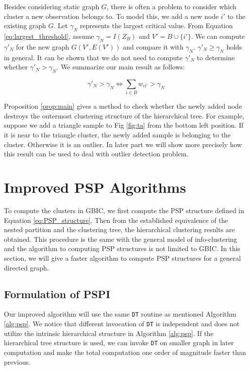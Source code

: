Besides considering static graph $G$, there is often a problem to consider which cluster a new observation belongs to.
To model this, we add a new node $i'$ to the existing graph $G$. Let $\gamma_N$ represents the largest critical value.
From Equation \eqref{eq:largest_threshold}, assume $\gamma_N = I(Z_B)$ and $V'=B \cup \{i'\}$. We can compute $\gamma'_N$ for the new graph $G(V', E(V'))$ and compare it with $\gamma_N$. $\gamma'_N \geq \gamma_N$ holds in general. It can be shown that we do not need to compute $\gamma'_N$ to determine whether $\gamma'_N>\gamma_N$. We summarize our main result as follows:
\begin{proposition}\label{prop:main}
\begin{equation}
\gamma'_N > \gamma_N \iff  \sum_{i \in B} w_{ii'} > \gamma_N 
\end{equation}
\end{proposition}
Proposition \ref{prop:main} gives a method to check whether the newly added node destroys the outermost clustering structure of the hierarchical tree.  For example, suppose we add a triangle sample to Fig \ref{fig:ta} from the bottom left position. If it is near to the triangle cluster, the newly added sample is belonging to the cluster. Otherwise it is an outlier. In later part we will show more precisely how this result can be used to deal with outlier detection problem.

\section{Improved PSP Algorithms}\label{sec:alg}
To compute the clusters in GBIC, we first compute the PSP structure defined in Equation \eqref{eq:PSP_structure}. Then from the established equivalence of the nested partition and the clustering tree, the hierarchical
clustering results are obtained. This procedure is the same with the general model of info-clustering and the algorithm to computing PSP structures is not limited to GBIC. In this section, we will give a faster algorithm to compute PSP structures for a general directed graph.

\subsection{Formulation of PSPI}
Our improved algorithm will use the same \texttt{DT} routine as mentioned Algorithm \ref{alg:psp}. We notice that different invocation of \texttt{DT} is independent and does not utilize the intrinsic hierarchical structure in Algorithm \ref{alg:psp}. If the hierarchical tree structure is used, we can invoke \texttt{DT} on smaller graph in later computation and make the total computation one order of magnitude faster than previous.


